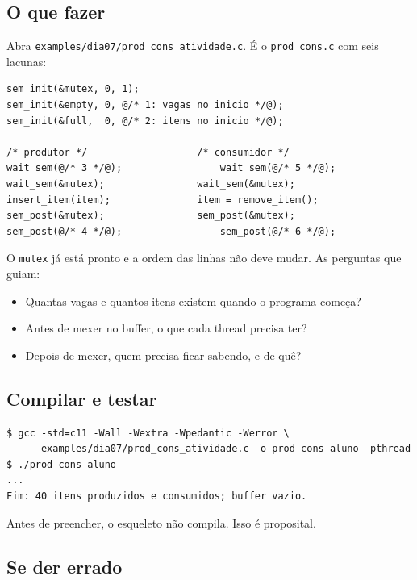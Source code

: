 \documentclass[11pt,a4paper]{article}
\newcommand{\cmd}[1]{\texttt{#1}}
\begin{document}
\subsection{O que fazer}

Abra \cmd{examples/dia07/prod\_cons\_atividade.c}. É o \cmd{prod\_cons.c} com seis lacunas:

\begin{lstlisting}[style=codigo]
sem_init(&mutex, 0, 1);
sem_init(&empty, 0, @/* 1: vagas no inicio */@);
sem_init(&full,  0, @/* 2: itens no inicio */@);

/* produtor */                   /* consumidor */
wait_sem(@/* 3 */@);                 wait_sem(@/* 5 */@);
wait_sem(&mutex);                wait_sem(&mutex);
insert_item(item);               item = remove_item();
sem_post(&mutex);                sem_post(&mutex);
sem_post(@/* 4 */@);                 sem_post(@/* 6 */@);
\end{lstlisting}

O \cmd{mutex} já está pronto e a ordem das linhas não deve mudar. As perguntas que guiam:

\begin{itemize}
    \item Quantas vagas e quantos itens existem quando o programa começa?
    \item Antes de mexer no buffer, o que cada thread precisa ter?
    \item Depois de mexer, quem precisa ficar sabendo, e de quê?
\end{itemize}

\subsection{Compilar e testar}

\begin{lstlisting}[style=terminal]
$ gcc -std=c11 -Wall -Wextra -Wpedantic -Werror \
      examples/dia07/prod_cons_atividade.c -o prod-cons-aluno -pthread
$ ./prod-cons-aluno
...
Fim: 40 itens produzidos e consumidos; buffer vazio.
\end{lstlisting}

Antes de preencher, o esqueleto não compila. Isso é proposital.

\subsection{Se der errado}
\end{document}
